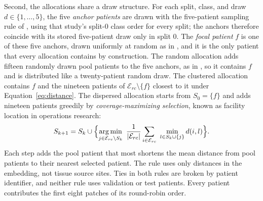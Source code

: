 \documentclass[11pt]{article}
\begin{document}
Second, the allocations share a draw structure. For each split, class, and draw $d\in\{1,\ldots,5\}$, the five \emph{anchor patients} are drawn with the five-patient sampling rule of \citet{queisler2026effectiveSupport}, using that study's split-0 class order for every split; the anchors therefore coincide with its stored five-patient draw only in split 0. The \emph{focal patient} $f$ is one of these five anchors, drawn uniformly at random as in \citet{queisler2026concentratedCoverage}, and it is the only patient that every allocation contains by construction. The random allocation adds fifteen randomly drawn pool patients to the five anchors, as in \citet{queisler2026concentratedCoverage}, so it contains $f$ and is distributed like a twenty-patient random draw. The clustered allocation contains $f$ and the nineteen patients of $\mathcal E_{rc}\setminus\{f\}$ closest to it under Equation~\eqref{eq:distance}. The dispersed allocation starts from $S_0=\{f\}$ and adds nineteen patients greedily by \emph{coverage-maximizing selection}, known as facility location in operations research:
\begin{equation}
 S_{k+1}=S_k\cup\Bigl\{\operatorname*{arg\,min}_{j\in\mathcal E_{rc}\setminus S_k}\ \frac{1}{|\mathcal E_{rc}|}\sum_{i\in\mathcal E_{rc}}\ \min_{l\in S_k\cup\{j\}} d(i,l)\Bigr\}.
 \label{eq:facility}
\end{equation}
\noindent Each step adds the pool patient that most shortens the mean distance from pool patients to their nearest selected patient. The rule uses only distances in the embedding, not tissue source sites. Ties in both rules are broken by patient identifier, and neither rule uses validation or test patients. Every patient contributes the first eight patches of its round-robin order.
\end{document}
